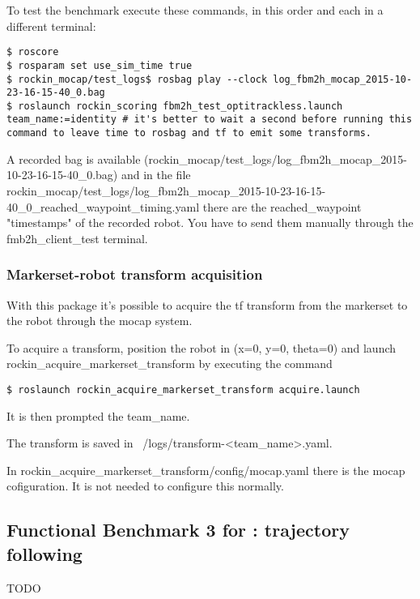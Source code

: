 \documentclass[a4paper]{article}
\begin{document}
To test the benchmark execute these commands, in this order and each in a different terminal:
\begin{verbatim}
$ roscore
$ rosparam set use_sim_time true
$ rockin_mocap/test_logs$ rosbag play --clock log_fbm2h_mocap_2015-10-23-16-15-40_0.bag
$ roslaunch rockin_scoring fbm2h_test_optitrackless.launch team_name:=identity # it's better to wait a second before running this command to leave time to rosbag and tf to emit some transforms.
\end{verbatim} 

A recorded bag is available (rockin_mocap/test_logs/log_fbm2h_mocap_2015-10-23-16-15-40_0.bag) and in the file rockin_mocap/test_logs/log_fbm2h_mocap_2015-10-23-16-15-40_0_reached_waypoint_timing.yaml there are the reached_waypoint "timestamps" of the recorded robot.
You have to send them manually through the fmb2h_client_test terminal.


\subsubsection{Markerset-robot transform acquisition}
\label{sec:Markerset-robot transform acquisition}

With this package it's possible to acquire the tf transform from the markerset to the robot through the mocap system.

To acquire a transform, position the robot in (x=0, y=0, theta=0) and launch rockin_acquire_markerset_transform by executing the command
\begin{verbatim}
$ roslaunch rockin_acquire_markerset_transform acquire.launch
\end{verbatim} 
It is then prompted the team_name.

The transform is saved in ~/logs/transform-<team_name>.yaml.

In rockin_acquire_markerset_transform/config/mocap.yaml there is the mocap cofiguration. It is not needed to configure this normally.


\clearpage

\subsection{Functional Benchmark 3 for \ro@Work: trajectory following}
\label{sec:fbm3w}
TODO
\end{document}
